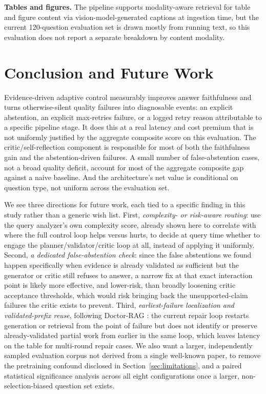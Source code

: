 \documentclass[conference]{IEEEtran}
\begin{document}
\textbf{Tables and figures.} The pipeline supports modality-aware retrieval for table
and figure content via vision-model-generated captions at ingestion time, but the
current 120-question evaluation set is drawn mostly from running text, so this
evaluation does not report a separate breakdown by content modality.

\section{Conclusion and Future Work}
\label{sec:conclusion}

Evidence-driven adaptive control measurably improves answer faithfulness and turns
otherwise-silent quality failures into diagnosable events: an explicit abstention, an
explicit max-retries failure, or a logged retry reason attributable to a specific
pipeline stage. It does this at a real latency and cost premium that is not uniformly
justified by the aggregate composite score on this evaluation. The
critic/self-reflection component is responsible for most of both the faithfulness gain
and the abstention-driven failures. A small number of false-abstention cases, not a
broad quality deficit, account for most of the aggregate composite gap against a naive
baseline. And the architecture's net value is conditional on question type, not
uniform across the evaluation set.

We see three directions for future work, each tied to a specific finding in this
study rather than a generic wish list. First, \emph{complexity- or risk-aware
routing}: use the query analyzer's own complexity score, already shown here to
correlate with where the full control loop helps versus hurts, to decide at query time
whether to engage the planner/validator/critic loop at all, instead of applying it
uniformly. Second, \emph{a dedicated false-abstention check}: since the false
abstentions we found happen specifically when evidence is already validated as
sufficient but the generator or critic still refuses to answer, a narrow fix at that
exact interaction point is likely more effective, and lower-risk, than broadly
loosening critic acceptance thresholds, which would risk bringing back the
unsupported-claim failures the critic exists to prevent. Third, \emph{earliest-failure
localization and validated-prefix reuse}, following Doctor-RAG
\cite{jiao2026doctorrag}: the current repair loop restarts generation or retrieval from
the point of failure but does not identify or preserve already-validated partial work
from earlier in the same loop, which leaves latency on the table for multi-round repair
cases. We also want a larger, independently sampled evaluation corpus not derived from
a single well-known paper, to remove the pretraining confound disclosed in
Section~\ref{sec:limitations}, and a paired statistical significance analysis across
all eight configurations once a larger, non-selection-biased question set exists.
\end{document}
